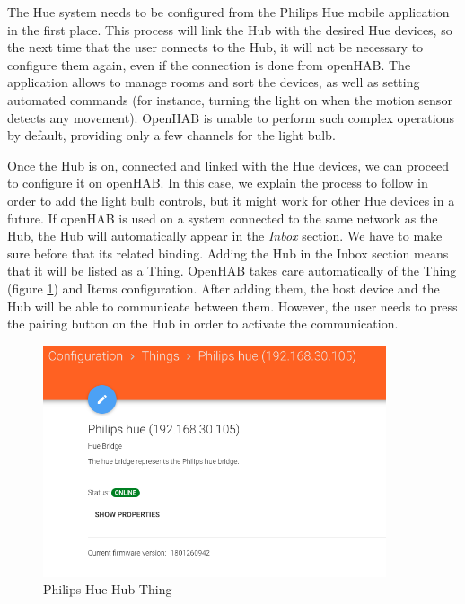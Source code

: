 The Hue system needs to be configured from the Philips Hue mobile application in the first place. This process will link the Hub with the
desired Hue devices, so the next time that the user connects to the Hub, it will not be necessary to configure them again, even if
the connection is done from openHAB. The application allows to manage rooms and sort the devices, as well as setting automated commands
(for instance, turning the light on when the motion sensor detects any movement). OpenHAB is unable to perform such complex operations
by default, providing only a few channels for the light bulb.

Once the Hub is on, connected and linked with the Hue devices, we can proceed to configure it on openHAB. In this case, we explain
the process to follow in order to add the light bulb controls, but it might work for other Hue devices in a future. If openHAB is
used on a system connected to the same network as the Hub, the Hub will automatically appear in the \textit{Inbox} section. We have
to make sure before that its related binding. Adding the Hub in the Inbox section means that it will be listed as a Thing. OpenHAB
takes care automatically of the Thing (figure \ref{fig:philips-hue-hub-thing}) and Items configuration. After adding them, the host
device and the Hub will be able to communicate between them. However, the user needs to press the pairing button on the Hub in
order to activate the communication.

\begin{figure}
    \centering
    \includegraphics[width=0.9\textwidth]{images/Chapter_07/philips-hue-hub-thing.png}
    \caption{Philips Hue Hub Thing}
    \label{fig:philips-hue-hub-thing}
\end{figure}

